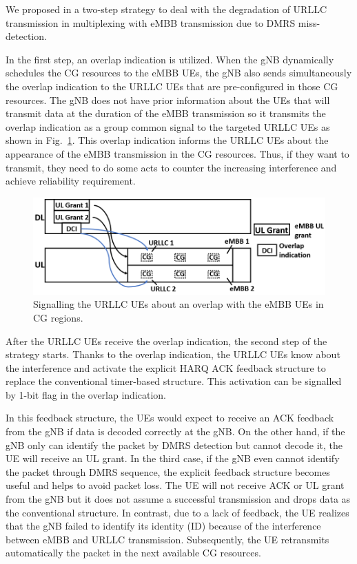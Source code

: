 \documentclass{ieeeaccess}
\begin{document}
We proposed in \cite{ad99} a two-step strategy to deal with the degradation of URLLC transmission in multiplexing with eMBB transmission due to DMRS miss-detection.

In the first step, an overlap indication is utilized. When the gNB dynamically schedules the CG resources to the eMBB UEs, the gNB also sends simultaneously the overlap indication to the URLLC UEs that are pre-configured in those CG resources. The gNB does not have prior information about the UEs that will transmit data at the duration of the eMBB transmission so it transmits the overlap indication as a group common signal to the targeted URLLC UEs as shown in Fig.~\ref{fig2}. This overlap indication informs the URLLC UEs about the appearance of the eMBB transmission in the CG resources. Thus, if they want to transmit, they need to do some acts to counter the increasing interference and achieve reliability requirement.

\begin{figure}[htbp]
\centerline{\includegraphics[scale=0.32]{fig2.PNG}}
\caption{Signalling the URLLC UEs about an overlap with the eMBB UEs in CG regions.}
\label{fig2}
\vspace{-2mm}
\end{figure}

After the URLLC UEs receive the overlap indication, the second step of the strategy starts. Thanks to the overlap indication, the URLLC UEs know about the interference and activate the explicit HARQ ACK feedback structure to replace the conventional timer-based structure. This activation can be signalled by 1-bit flag in the overlap indication. 

In this feedback structure, the UEs would expect to receive an ACK feedback from the gNB if data is decoded correctly at the gNB. On the other hand, if the gNB only can identify the packet by DMRS detection but cannot decode it, the UE will receive an UL grant. In the third case, if the gNB even cannot identify the packet through DMRS sequence, the explicit feedback structure becomes useful and helps to avoid packet loss. The UE will not receive ACK or UL grant from the gNB but it does not assume a successful transmission and drops data as the conventional structure. In contrast, due to a lack of feedback, the UE realizes that the gNB failed to identify its identity (ID) because of the interference between eMBB and URLLC transmission. Subsequently, the UE retransmits automatically the packet in the next available CG resources. 
\end{document}
